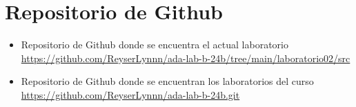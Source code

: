\documentclass{article}
\begin{document}

\section{Repositorio de Github}
	\begin{itemize}
		\item Repositorio de Github donde se encuentra el actual laboratorio \\
		\url{https://github.com/ReyserLynnn/ada-lab-b-24b/tree/main/laboratorio02/src}

        \item Repositorio de Github donde se encuentran los laboratorios del curso\\
		\url{https://github.com/ReyserLynnn/ada-lab-b-24b.git}
	\end{itemize}

\end{document}
